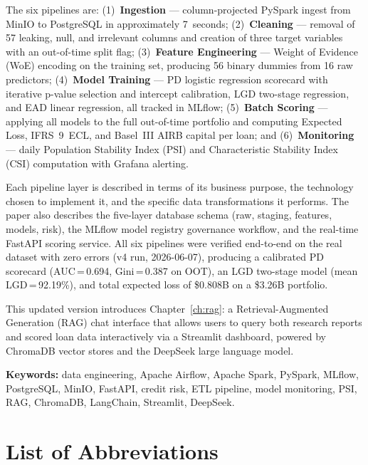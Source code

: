 \documentclass[12pt,a4paper]{report}
\begin{document}
The six pipelines are: (1)~\textbf{Ingestion} --- column-projected PySpark ingest from MinIO to PostgreSQL in approximately 7~seconds; (2)~\textbf{Cleaning} --- removal of 57 leaking, null, and irrelevant columns and creation of three target variables with an out-of-time split flag; (3)~\textbf{Feature Engineering} --- Weight of Evidence (WoE) encoding on the training set, producing 56 binary dummies from 16 raw predictors; (4)~\textbf{Model Training} --- PD logistic regression scorecard with iterative p-value selection and intercept calibration, LGD two-stage regression, and EAD linear regression, all tracked in MLflow; (5)~\textbf{Batch Scoring} --- applying all models to the full out-of-time portfolio and computing Expected Loss, IFRS~9~ECL, and Basel~III AIRB capital per loan; and (6)~\textbf{Monitoring} --- daily Population Stability Index (PSI) and Characteristic Stability Index (CSI) computation with Grafana alerting.

Each pipeline layer is described in terms of its business purpose, the technology chosen to implement it, and the specific data transformations it performs. The paper also describes the five-layer database schema (raw, staging, features, models, risk), the MLflow model registry governance workflow, and the real-time FastAPI scoring service. All six pipelines were verified end-to-end on the real dataset with zero errors (v4 run, 2026-06-07), producing a calibrated PD scorecard (AUC\,=\,0.694, Gini\,=\,0.387 on OOT), an LGD two-stage model (mean LGD\,=\,92.19\%), and total expected loss of \$0.808B on a \$3.26B portfolio.

\vspace{0.5em}
This updated version introduces Chapter~\ref{ch:rag}: a Retrieval-Augmented Generation (RAG) chat interface that allows users to query both research reports and scored loan data interactively via a Streamlit dashboard, powered by ChromaDB vector stores and the DeepSeek large language model.

\vspace{0.5em}
\noindent\textbf{Keywords:} data engineering, Apache Airflow, Apache Spark, PySpark, MLflow, PostgreSQL, MinIO, FastAPI, credit risk, ETL pipeline, model monitoring, PSI, RAG, ChromaDB, LangChain, Streamlit, DeepSeek.

\tableofcontents
\listoffigures
\listoftables

\chapter*{List of Abbreviations}
\end{document}

